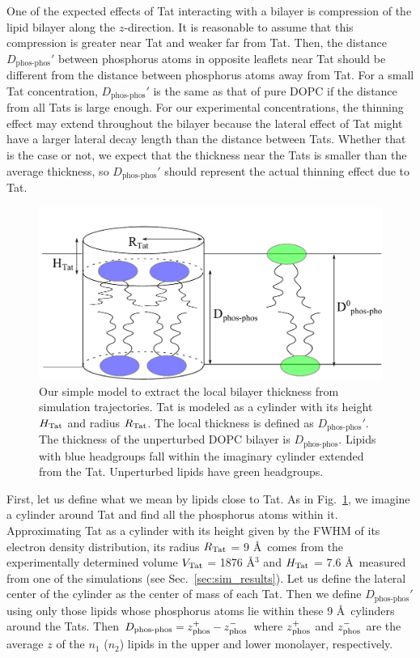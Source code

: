 One of the expected effects of Tat interacting with a bilayer is 
compression of the lipid bilayer along the $z$-direction. It is 
reasonable to assume that this compression is greater near Tat and
weaker far from Tat.
Then, the distance $D_\text{phos-phos}'$ between phosphorus atoms in opposite
leaflets near Tat should be different from the distance between
phosphorus atoms away from Tat.  
For a small Tat concentration, $D_\textrm{phos-phos}'$ is the same as that of 
pure DOPC if the distance from all Tats is large enough.  
For our experimental concentrations, the thinning effect may extend throughout 
the bilayer because the lateral effect of Tat might have a larger lateral decay 
length than the distance between Tats. Whether that is the case or not, we 
expect that the thickness near the Tats is smaller than the average thickness,
so $D_\textrm{phos-phos}'$ should represent the actual thinning effect due to Tat. 

\begin{figure}[htbp]
  \centering
  \includegraphics[scale=0.7]{./figures/Tat/MMs/cylinder_model}
  \caption{Our simple model to extract the local bilayer thickness from 
  simulation trajectories. Tat is modeled as a cylinder with its height $H_\textrm{Tat}$ 
  and radius $R_\textrm{Tat}$. The local thickness is defined as $D_\textrm{phos-phos}'$. 
  The thickness of the unperturbed DOPC bilayer is $D_\textrm{phos-phos}$. 
  Lipids with blue headgroups fall within the imaginary cylinder extended from
  the Tat. Unperturbed lipids have green headgroups.}
  \label{fig:cylinder_model}
\end{figure}
 
First, let us define what we mean by lipids close to Tat.  
As in Fig.~\ref{fig:cylinder_model}, we imagine a cylinder around Tat and 
find all the phosphorus atoms within it. 
Approximating Tat as a cylinder 
with its height given by the FWHM of its electron density distribution, 
its radius $R_\textrm{Tat}$ = 9 \AA\ comes from the experimentally determined volume $V_\textrm{Tat}$ = 1876 \AA$^3$ and 
$H_\textrm{Tat}$ = 7.6 \AA\ measured from one of the simulations (see Sec.~\ref{sec:sim_results}). 
Let us define the lateral center of the cylinder as the center of mass of each
Tat. Then we define $D_\textrm{phos-phos}'$ using only those lipids whose 
phosphorus atoms lie within these 9 \AA\ cylinders around the 
Tats. 
Then $D_\textrm{phos-phos} = z_\textrm{phos}^+ - z_\textrm{phos}^-$ where $z_\textrm{phos}^+$ and $z_\textrm{phos}^-$ 
are the average $z$ of the $n_1$ ($n_2$) lipids in the upper and lower monolayer, respectively.  

